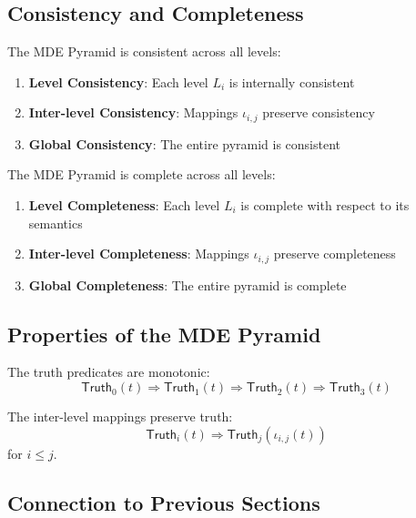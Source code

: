 \subsection{Consistency and Completeness}

\begin{theorem}
The MDE Pyramid is consistent across all levels:
\begin{enumerate}
\item \textbf{Level Consistency}: Each level $L_i$ is internally consistent
\item \textbf{Inter-level Consistency}: Mappings $\iota_{i,j}$ preserve consistency
\item \textbf{Global Consistency}: The entire pyramid is consistent
\end{enumerate}
\end{theorem}

\begin{theorem}
The MDE Pyramid is complete across all levels:
\begin{enumerate}
\item \textbf{Level Completeness}: Each level $L_i$ is complete with respect to its semantics
\item \textbf{Inter-level Completeness}: Mappings $\iota_{i,j}$ preserve completeness
\item \textbf{Global Completeness}: The entire pyramid is complete
\end{enumerate}
\end{theorem}

\subsection{Properties of the MDE Pyramid}

\begin{proposition}[Monotonicity]
The truth predicates are monotonic:
$$\mathsf{Truth}_0(t) \Rightarrow \mathsf{Truth}_1(t) \Rightarrow \mathsf{Truth}_2(t) \Rightarrow \mathsf{Truth}_3(t)$$
\end{proposition}

\begin{proposition}[Preservation]
The inter-level mappings preserve truth:
$$\mathsf{Truth}_i(t) \Rightarrow \mathsf{Truth}_j(\iota_{i,j}(t))$$
for $i \leq j$.
\end{proposition}

\subsection{Connection to Previous Sections}

